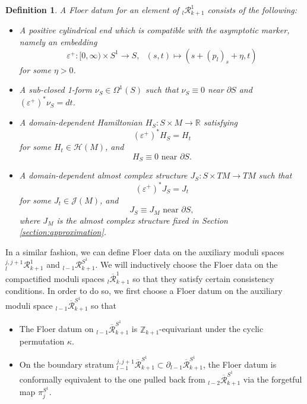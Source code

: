 \documentclass[a4paper]{article}
\newtheorem{definition}[theorem]{Definition}
\numberwithin{equation}{section}
\begin{document}
\begin{definition}\label{definition:data}
A Floer datum for an element of ${}_l\mathcal{R}_{k+1}^1$ consists of the following:
\begin{itemize}
	\item A positive cylindrical end which is compatible with the asymptotic marker, namely an embedding
	\begin{equation}
	\varepsilon^+:[0,\infty)\times S^1\rightarrow S,\textrm{ }(s,t)\mapsto\left(s+(p_l)_s+\eta,t\right)
	\end{equation}
	for some $\eta>0$.
	\item A sub-closed 1-form $\nu_S\in\Omega^1(S)$ such that $\nu_S\equiv0$ near $\partial S$ and $(\varepsilon^+)^\ast\nu_S=dt$.
	\item A domain-dependent Hamiltonian $H_S:S\times M\rightarrow\mathbb{R}$ satisfying
	\begin{equation}
	(\varepsilon^+)^\ast H_S=H_t
	\end{equation}
    for some $H_t\in\mathcal{H}(M)$, and
    \begin{equation}
    H_S\equiv0\textrm{ near }\partial S.
    \end{equation}
    \item A domain-dependent almost complex structure $J_S:S\times\mathit{TM}\rightarrow\mathit{TM}$ such that
    \begin{equation}
    (\varepsilon^+)^\ast J_S=J_t
    \end{equation}
    for some $J_t\in\mathcal{J}(M)$, and
    \begin{equation}
    J_S\equiv J_M\textrm{ near }\partial S,
    \end{equation}
    where $J_M$ is the almost complex structure fixed in Section \ref{section:approximation}.
\end{itemize}
\end{definition}

In a similar fashion, we can define Floer data on the auxiliary moduli spaces ${}_l^{j,j+1}\mathcal{R}_{k+1}^1$ and ${}_{l-1}\mathcal{R}_{k+1}^{S^1}$. We will inductively choose the Floer data on the compactified moduli spaces ${}_l\overline{\mathcal{R}}_{k+1}^1$ so that they satisfy certain consistency conditions. In order to do so, we first choose a Floer datum on the auxiliary moduli space ${}_{l-1}\overline{\mathcal{R}}_{k+1}^{S^1}$ so that
\begin{itemize}
	\item The Floer datum on ${}_{l-1}\overline{\mathcal{R}}_{k+1}^{S^1}$ is $\mathbb{Z}_{k+1}$-equivariant under the cyclic permutation $\kappa$.
	\item On the boundary stratum ${}_{l-1}^{j,j+1}\overline{\mathcal{R}}_{k+1}^{S^1}\subset\partial{}_{l-1}\overline{\mathcal{R}}_{k+1}^{S^1}$, the Floer datum is conformally equivalent to the one pulled back from ${}_{l-2}\overline{\mathcal{R}}_{k+1}^{S^1}$ via the forgetful map $\pi_j^{S^1}$.
\end{itemize}
\end{document}
